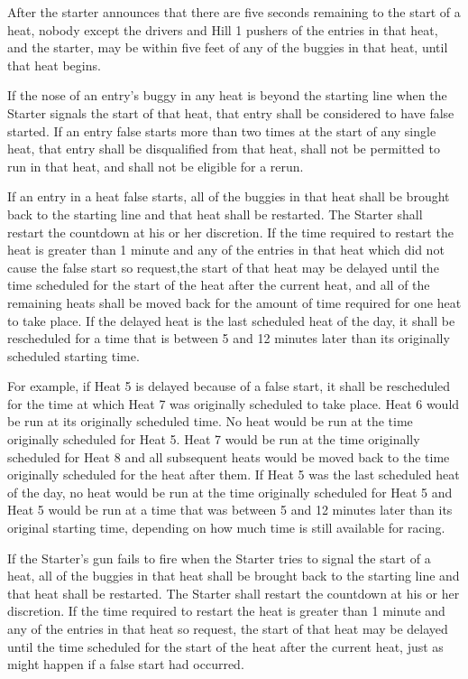 	After the starter announces that there are five seconds remaining to the start of a heat, nobody except the drivers and Hill 1 pushers of the entries in that heat, and the starter, may be within five feet of any of the buggies in that heat, until that heat begins.

	If the nose of an entry's buggy in any heat is beyond the starting line when the Starter signals the start of that heat, that entry shall be considered to have false started. If an entry false starts more than two times at the start of any single heat, that entry shall be disqualified from that heat, shall not be permitted to run in that heat, and shall not be eligible for a rerun.

	If an entry in a heat false starts, all of the buggies in that heat shall be brought back to the starting line and that heat shall be restarted. The Starter shall restart the countdown at his or her discretion. If the time required to restart the heat is greater than 1 minute and any of the entries in that heat which did not cause the false start so request,the start of that heat may be delayed until the time scheduled for the start of the heat after the current heat, and all of the remaining heats shall be moved back for the amount of time required for one heat to take place. If the delayed heat is the last scheduled heat of the day, it shall be rescheduled for a time that is between 5 and 12 minutes later than its originally scheduled starting time.

	For example, if Heat 5 is delayed because of a false start, it shall be rescheduled for the time at which Heat 7 was originally scheduled to take place. Heat 6 would be run at its originally scheduled time. No heat would be run at the time originally scheduled for Heat 5. Heat 7 would be run at the time originally scheduled for Heat 8 and all subsequent heats would be moved back to the time originally scheduled for the heat after them. If Heat 5 was the last scheduled heat of the day, no heat would be run at the time originally scheduled for Heat 5 and Heat 5 would be run at a time that was between 5 and 12 minutes later than its original starting time, depending on how much time is still available for racing.

	If the Starter's gun fails to fire when the Starter tries to signal the start of a heat, all of the buggies in that heat shall be brought back to the starting line and that heat shall be restarted. The Starter shall restart the countdown at his or her discretion. If the time required to restart the heat is greater than 1 minute and any of the entries in that heat so request, the start of that heat may be delayed until the time scheduled for the start of the heat after the current heat, just as might happen if a false start had occurred.

